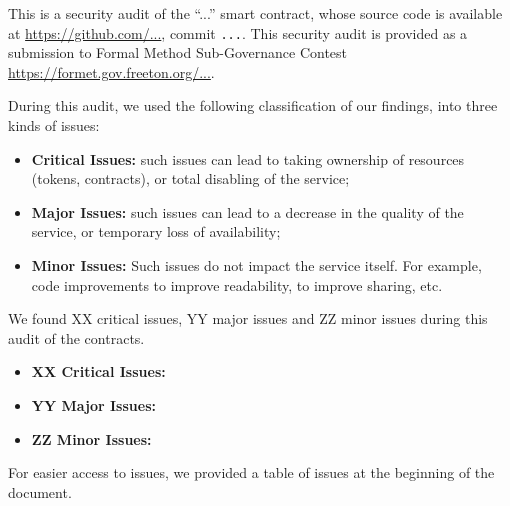 

This is a security audit of the ``...'' smart contract,
whose source code is available at
\url{https://github.com/...}, commit
\verb+...+. This security audit is provided as a submission to
Formal Method Sub-Governance Contest
\url{https://formet.gov.freeton.org/...}.

During this audit, we used the following classification of our findings, into three kinds of issues:
\begin{itemize}
\item {\bf Critical Issues:} such issues can lead to taking ownership of resources (tokens, contracts), or total
  disabling of the service;
\item {\bf Major Issues:} such issues can lead to a decrease in the quality of the service,
  or temporary loss of availability;
\item {\bf Minor Issues:} Such issues do not impact the service
  itself. For example, code improvements to improve readability, to
  improve sharing, etc.
\end{itemize}

We found XX critical issues, YY major issues and ZZ minor issues
during this audit of the contracts.

\begin{itemize}
\item {\bf XX Critical Issues:}
\item {\bf YY Major Issues:}
\item {\bf ZZ Minor Issues:}
\end{itemize}

For easier access to issues, we provided a table of issues at the
beginning of the document.

